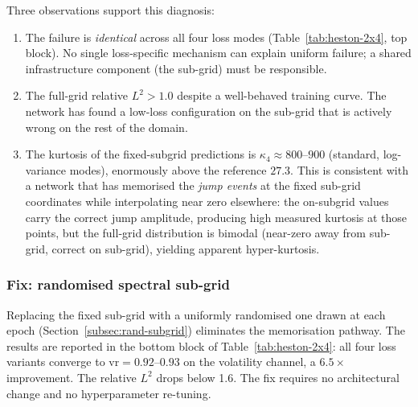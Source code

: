 \documentclass[review,12pt]{elsarticle}
\begin{document}
Three observations support this diagnosis:
\begin{enumerate}
\item The failure is \emph{identical} across all four loss modes
(Table~\ref{tab:heston-2x4}, top block). No single loss-specific
mechanism can explain uniform failure; a shared infrastructure
component (the sub-grid) must be responsible.
\item The full-grid relative \(L^2 > 1.0\) despite a well-behaved
training curve. The network has found a low-loss configuration on
the sub-grid that is actively wrong on the rest of the domain.
\item The kurtosis of the fixed-subgrid predictions is
\(\kappa_4 \approx 800\)--\(900\) (standard, log-variance modes),
enormously above the reference \(27.3\). This is consistent with
a network that has memorised the \emph{jump events} at the fixed
sub-grid coordinates while interpolating near zero elsewhere: the
on-subgrid values carry the correct jump amplitude, producing
high measured kurtosis at those points, but the full-grid
distribution is bimodal (near-zero away from sub-grid, correct on
sub-grid), yielding apparent hyper-kurtosis.
\end{enumerate}

\subsubsection{Fix: randomised spectral sub-grid}

Replacing the fixed sub-grid with a uniformly randomised one drawn
at each epoch (Section~\ref{subsec:rand-subgrid}) eliminates the
memorisation pathway. The results are reported in the bottom block
of Table~\ref{tab:heston-2x4}: all four loss variants converge to
\(\mathrm{vr} = 0.92\)--\(0.93\) on the volatility channel, a
\(6.5\times\) improvement. The relative \(L^2\) drops below 1.6.
The fix requires no architectural change and no hyperparameter
re-tuning.
\end{document}
